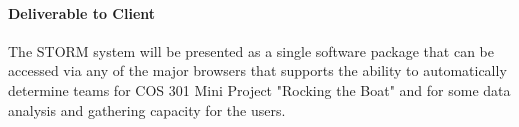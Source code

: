 \documentclass[12pt]{article}
\begin{document}
\paragraph{Deliverable to Client}
The STORM system will be presented as a single software package that can be accessed via any of the major browsers that supports the ability to automatically determine teams for COS 301 Mini Project "Rocking the Boat" and for some data analysis and gathering capacity for the users.
\end{document}
